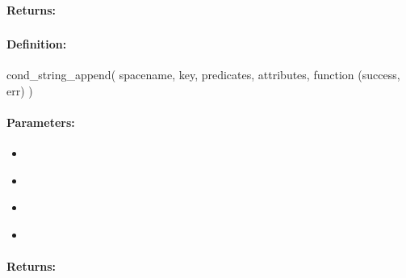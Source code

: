 \paragraph{Returns:}


\pagebreak
\subsubsection{}
\label{api:nodejs:cond_string_append}


\paragraph{Definition:}
\begin{javascriptcode}
cond_string_append(
        spacename, key, predicates, attributes, function (success, err) {})
\end{javascriptcode}
\paragraph{Parameters:}
\begin{itemize}[noitemsep]
\item {}\\

\item {}\\

\item {}\\

\item {}\\

\end{itemize}

\paragraph{Returns:}


\pagebreak
\subsubsection{}
\label{api:nodejs:group_string_append}



